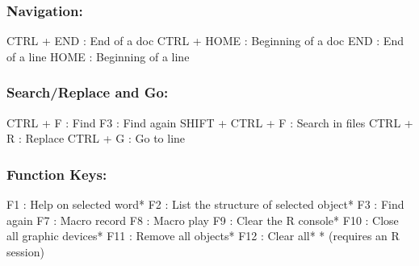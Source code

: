 \subsubsection{Navigation:}

\vspace{-0.5cm}
\begin{Rtables}[caption={[Navigation keyboard shortcuts]
    Navigation keyboard shortcuts},
  label=hotkey:navigation]
  CTRL  + END             : End of a doc
  CTRL  + HOME            : Beginning of a doc
  END                     : End of a line
  HOME                    : Beginning of a line
\end{Rtables}


\newpage
\subsubsection{Search/Replace and Go:}

\vspace{-0.5cm}
\begin{Rtables}[caption={[Search/Replace and go keyboard shortcuts]
    Search/Replace and go keyboard shortcuts},
  label=hotkey:search]
  CTRL  + F               : Find
  F3                      : Find again
  SHIFT + CTRL + F        : Search in files
  CTRL  + R               : Replace
  CTRL  + G               : Go to line
\end{Rtables}


\subsubsection{Function Keys:}

\vspace{-0.5cm}
\begin{Rtables}[caption={[Function keys]
    Function keys},
  label=hotkey:function]
  F1                      : Help on selected word*
  F2                      : List the structure of selected object*
  F3                      : Find again
  F7                      : Macro record
  F8                      : Macro play
  F9                      : Clear the R console*
  F10                     : Close all graphic devices*
  F11                     : Remove all objects*
  F12                     : Clear all*
  * (requires an R session)
\end{Rtables}


